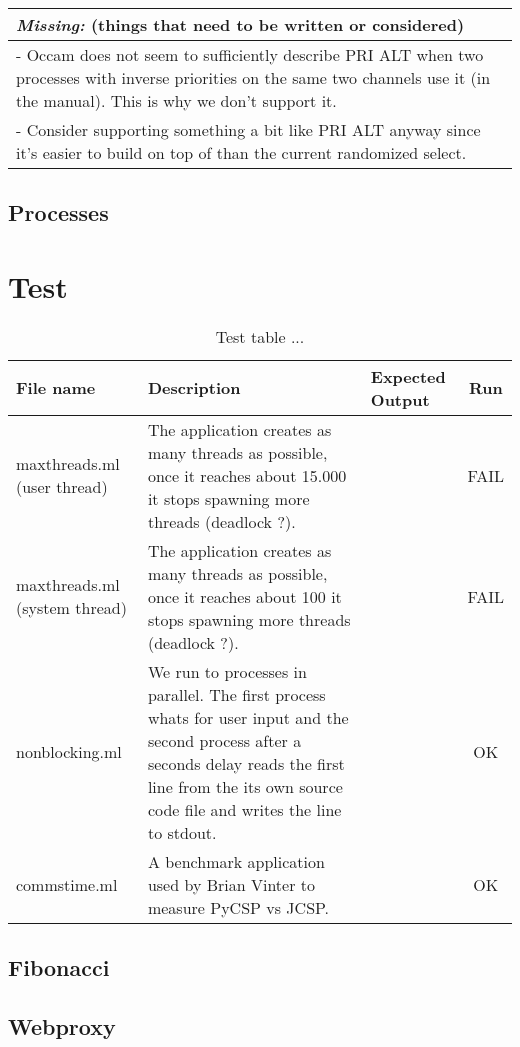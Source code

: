 \documentclass[a4paper,12pt]{article}
\newcommand{\missing}[1]{
\begin{tabular}{|p{11cm}|}
\hline
\emph{Missing:} {\scriptsize (things that need to be written or considered)} \\
\hline
#1
\hline
\end{tabular}
}
\begin{document}
\missing{
- Occam does not seem to sufficiently describe PRI ALT when two processes with inverse priorities
on the same two channels use it (in the manual). This is why we don't support it. \\
- Consider supporting something a bit like PRI ALT anyway since it's easier to build on top of
than the current randomized select. \\
}

\subsection{Processes}

\section{Test}

\label{test}
\begin{table}[!ht]
\centering
\begin{tabular}{|p{3cm}|p{4.0cm}|p{4.0cm}|c|}
    \hline
    	File name &
	Description &
	Expected Output &
	Run \\
    \hline
    	maxthreads.ml (user thread) &
        The application creates as many threads as possible, once it reaches
        about 15.000 it stops spawning more threads (deadlock ?).&
        &
	FAIL \\
    \hline
    	maxthreads.ml (system thread) &
        The application creates as many threads as possible, once it reaches
        about 100 it stops spawning more threads (deadlock ?).&
        &
	FAIL \\
    \hline
    	nonblocking.ml &
        We run to processes in parallel. The first process whats for user input
        and the second process after a seconds delay reads the first line from
        the its own source code file and writes the line to stdout.&
        &
	OK \\
    \hline
    	commstime.ml &
        A benchmark application used by Brian Vinter to measure PyCSP vs JCSP.&
        &
	OK \\
    \hline
\end{tabular} 
\caption{Test table ...}
\label{testtable}
\end{table}

\subsection{Fibonacci}


\subsection{Webproxy}
\end{document}
